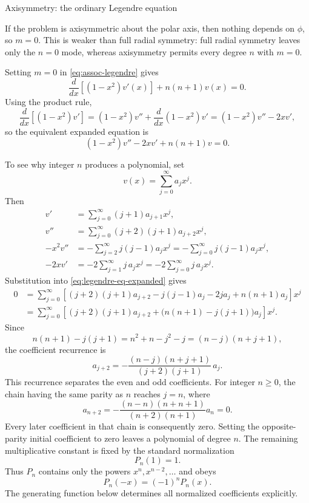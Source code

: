 \documentclass[11pt]{beamer}
\begin{document}
\begin{frame}[allowframebreaks]{Axisymmetry: the ordinary Legendre equation}
\footnotesize

If the problem is axisymmetric about the polar axis, then nothing depends on $\phi$, so
$m=0$.  This is weaker than full radial symmetry: full radial symmetry leaves only the
$n=0$ mode, whereas axisymmetry permits every degree $n$ with $m=0$.

Setting $m=0$ in \eqref{eq:assoc-legendre} gives
\begin{equation}
  \frac{d}{dx}\!\left[(1-x^2)v'(x)\right]+n(n+1)v(x)=0.
  \label{eq:legendre-eq}
\end{equation}
Using the product rule,
\[
  \frac{d}{dx}\!\left[(1-x^2)v'\right]
   =(1-x^2)v''+\frac{d}{dx}(1-x^2)v'
   =(1-x^2)v''-2xv',
\]
so the equivalent expanded equation is
\begin{equation}
  (1-x^2)v''-2xv'+n(n+1)v=0.
  \label{eq:legendre-eq-expanded}
\end{equation}

To see why integer $n$ produces a polynomial, set
\[
  v(x)=\sum_{j=0}^{\infty}a_jx^j.
\]
Then
\begin{align*}
  v'
   &=\sum_{j=0}^{\infty}(j+1)a_{j+1}x^j,\\
  v''
   &=\sum_{j=0}^{\infty}(j+2)(j+1)a_{j+2}x^j,\\
  -x^2v''
   &=-\sum_{j=2}^{\infty}j(j-1)a_jx^j
    =-\sum_{j=0}^{\infty}j(j-1)a_jx^j,\\
  -2xv'
   &=-2\sum_{j=1}^{\infty}j\,a_jx^j
    =-2\sum_{j=0}^{\infty}j\,a_jx^j.
\end{align*}
Substitution into \eqref{eq:legendre-eq-expanded} gives
\begin{align*}
  0
   &=
    \sum_{j=0}^{\infty}
    \left[
      (j+2)(j+1)a_{j+2}
      -j(j-1)a_j-2ja_j+n(n+1)a_j
    \right]x^j\\
   &=
    \sum_{j=0}^{\infty}
    \left[
      (j+2)(j+1)a_{j+2}
      +\bigl(n(n+1)-j(j+1)\bigr)a_j
    \right]x^j.
\end{align*}
Since
\[
  n(n+1)-j(j+1)
   =n^2+n-j^2-j
   =(n-j)(n+j+1),
\]
the coefficient recurrence is
\begin{equation}
  a_{j+2}
   =-\frac{(n-j)(n+j+1)}{(j+2)(j+1)}\,a_j.
  \label{eq:legendre-coeff-recurrence}
\end{equation}
This recurrence separates the even and odd coefficients.  For integer $n\ge0$, the
chain having the same parity as $n$ reaches $j=n$, where
\[
  a_{n+2}
   =-\frac{(n-n)(n+n+1)}{(n+2)(n+1)}a_n
   =0.
\]
Every later coefficient in that chain is consequently zero.  Setting the
opposite-parity initial coefficient to zero leaves a polynomial of degree $n$.
The remaining multiplicative constant is fixed by the standard normalization
\[
  P_n(1)=1.
\]
Thus $P_n$ contains only the powers $x^n,x^{n-2},\ldots$ and obeys
\[
  P_n(-x)=(-1)^nP_n(x).
\]
The generating function below determines all normalized coefficients explicitly.
\end{frame}
\end{document}
